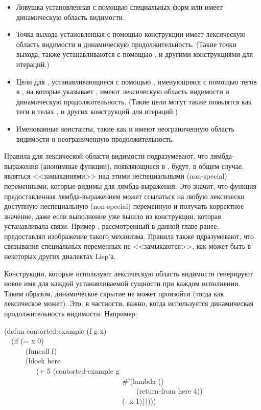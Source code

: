 \begin{itemize}

\item Ловушка установленная с помощью специальных форм  или
   имеет динамическую область видимости.

\item
Точка выхода установленная с помощью конструкции  имеет лексическую
область видимости и динамическую продолжительность. (Такие точки выхода, также
устанавливаются с помощью ,  и другими конструкциями для итераций.)

\item
Цели для , устанавливающиеся с помощью , именующияся с
помощью тегов в , на которые указывает , имеют лексическую
область видимости и динамическую продолжительность. (Такие  цели могут
также появлятся как теги в телах ,  и других конструкций для итераций.)

\item
Именованные константы, такие как  и  имеют неограниченную область
видимости и неограниченную продолжительность.
\end{itemize}

Правила для лексической области видимости подразумевают, что лямбда-выражения
(анонимные функции), появляющиеся в , будут, в общем случае,
являться <<замыканиями>> над этими неспециальными (non-special) переменными,
которые видимы для лямбда-выражения.
Это значит, что функция предоставленная лямбда-выражением может ссылаться на
любую лексически доступную неспециальную (non-special) переменную и получать
корректное значение, даже если выполнение уже вышло из конструкции, которая
устанавливала связи.
Пример , рассмотренный в данной главе ранее, предоставлял
изображение такого механизма.
Правила также пдразумевают, что связывания специальных переменных не
<<замыкаются>>, как может быть в некоторых других диалектах Lisp'а.

Конструкции, которые используют лексическую область видимости генерируют новое имя
для каждой устанавливаемой сущности при каждом исполнении.
Таким образом, динамическое скрытие не может произойти (тогда как лексическое
может).
Это, в частности, важно, когда используется динамическая продолжительность
видимости.
Например:

\begin{lisp}
(defun contorted-example (f g x) \\
~~(if (= x 0) \\
~~~~~~(funcall f) \\
~~~~~~(block here \\
~~~~~~~~~(+ 5 (contorted-example g \\
~~~~~~~~~~~~~~~~~~~~~~~~~~~~~~~~~\#'(lambda () \\
~~~~~~~~~~~~~~~~~~~~~~~~~~~~~~~~~~~~~(return-from here 4)) \\
~~~~~~~~~~~~~~~~~~~~~~~~~~~~~~~~~(- x 1))))))
\end{lisp}

